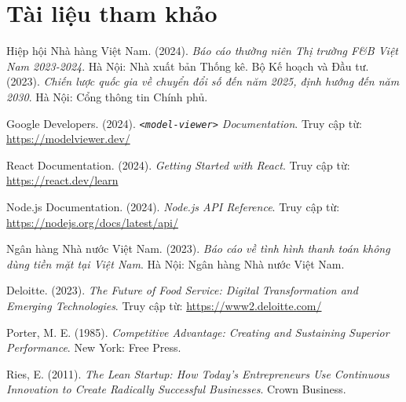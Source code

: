 \documentclass[12pt,a4paper]{article}
\begin{document}
\section{Tài liệu tham khảo}
\begin{thebibliography}{99} %
    Hiệp hội Nhà hàng Việt Nam. (2024). \textit{Báo cáo thường niên Thị trường F\&B Việt Nam 2023-2024}. Hà Nội: Nhà xuất bản Thống kê.
    Bộ Kế hoạch và Đầu tư. (2023). \textit{Chiến lược quốc gia về chuyển đổi số đến năm 2025, định hướng đến năm 2030}. Hà Nội: Cổng thông tin Chính phủ.

    Google Developers. (2024). \textit{\texttt{<model-viewer>} Documentation}. Truy cập từ: \url{https://modelviewer.dev/}

    React Documentation. (2024). \textit{Getting Started with React}. Truy cập từ: \url{https://react.dev/learn}

    Node.js Documentation. (2024). \textit{Node.js API Reference}. Truy cập từ: \url{https://nodejs.org/docs/latest/api/}

    Ngân hàng Nhà nước Việt Nam. (2023). \textit{Báo cáo về tình hình thanh toán không dùng tiền mặt tại Việt Nam}. Hà Nội: Ngân hàng Nhà nước Việt Nam.

    Deloitte. (2023). \textit{The Future of Food Service: Digital Transformation and Emerging Technologies}. Truy cập từ: \url{https://www2.deloitte.com/}

    Porter, M. E. (1985). \textit{Competitive Advantage: Creating and Sustaining Superior Performance}. New York: Free Press.

    Ries, E. (2011). \textit{The Lean Startup: How Today's Entrepreneurs Use Continuous Innovation to Create Radically Successful Businesses}. Crown Business.
\end{thebibliography}
\end{document}
